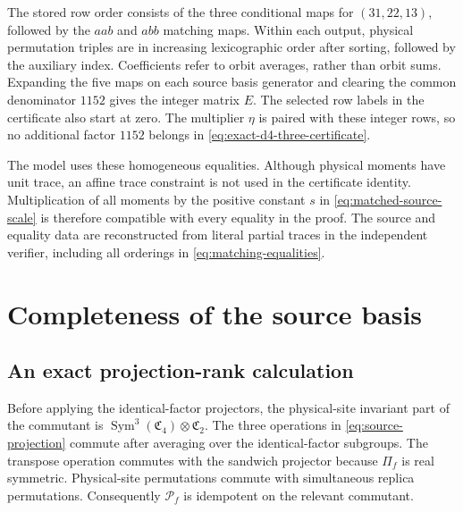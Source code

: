 \documentclass[aps,pra,reprint,superscriptaddress,amsmath,amssymb,floatfix,nofootinbib]{revtex4-2}
\newcommand{\Sym}{\operatorname{Sym}}
\begin{document}
The stored row order consists of the three conditional maps for
$(31,22,13)$, followed by the $aab$ and $abb$ matching maps.
Within each output, physical permutation triples are in increasing
lexicographic order after sorting, followed by the auxiliary index.
Coefficients refer to orbit averages, rather than orbit sums.
Expanding the five maps on each source basis generator and clearing the
common denominator $1152$ gives the integer matrix $E$.
The selected row labels in the certificate also start at zero.
The multiplier $\eta$ is paired with these integer rows, so no additional
factor $1152$ belongs in \cref{eq:exact-d4-three-certificate}.

The model uses these homogeneous equalities. Although physical moments
have unit trace, an affine trace constraint is not used in the
certificate identity. Multiplication of all moments by the positive
constant $s$ in \cref{eq:matched-source-scale} is therefore compatible
with every equality in the proof.
The source and equality data are reconstructed from literal partial
traces in the independent verifier, including all orderings in
\cref{eq:matching-equalities}.

\section{Completeness of the source basis}
\label{app:source}

\subsection{An exact projection-rank calculation}

Before applying the identical-factor projectors, the physical-site
invariant part of the commutant is
$\Sym^3(\mathfrak C_4)\otimes\mathfrak C_2$.
The three operations in \cref{eq:source-projection} commute after
averaging over the identical-factor subgroups. The transpose operation
commutes with the sandwich projector because $\Pi_f$ is real symmetric.
Physical-site permutations commute with simultaneous replica permutations.
Consequently $\mathcal P_f$ is idempotent on the relevant commutant.
\end{document}
